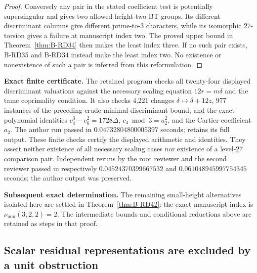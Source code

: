 \begin{proof}
Conversely any pair in the stated coefficient test is potentially
supersingular and gives two allowed height-two BT groups. Its
different discriminant columns give different prime-to-$3$
characters, while its isomorphic $27$-torsion gives a failure at
manuscript index two. The proved upper bound in
Theorem~\ref{thm:B-RD34} then makes the least index three.
If no such pair exists, B-RD35 and B-RD34 instead make the least
index two. No existence or nonexistence of such a pair is inferred
from this reformulation.
\end{proof}

\par\smallskip\noindent\textbf{Exact finite certificate.}
The retained program
 checks all twenty-four
displayed discriminant valuations against the necessary scaling equation
$12r=m\delta$ and the tame coprimality condition. It also checks 4,221
changes $\delta\mapsto\delta+12z$, 977 instances of the preceding crude
minimal-discriminant bound, and the exact polynomial identities
$c_4^3-c_6^2=1728\Delta$, $c_4\bmod3=a_2^2$, and the Cartier coefficient
$a_2$. The author run passed in $0.04732804800005397$ seconds;
 retains its
full output. These finite checks certify the displayed arithmetic and
identities. They assert neither existence of all necessary scaling cases
nor existence of a level-$27$ comparison pair. Independent reruns by the
root reviewer and the second reviewer passed in respectively
$0.04524370399667532$ and $0.061048945997754345$ seconds; the author output
was preserved.

\par\smallskip\noindent\textbf{Subsequent exact determination.}
The remaining small-height alternatives isolated here are settled in
Theorem~\ref{thm:B-RD42}: the exact manuscript index is
$\nu_{\min}(3,2,2)=2$. The intermediate bounds and conditional
reductions above are retained as steps in that proof.


\subsection{Scalar residual representations are excluded by a unit obstruction}


